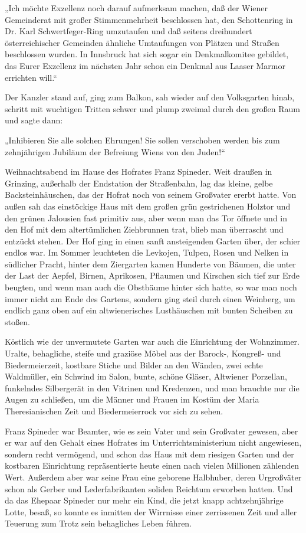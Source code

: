 „Ich möchte Exzellenz noch darauf aufmerksam machen, daß der Wiener
Gemeinderat mit großer Stimmenmehrheit beschlossen hat, den
Schottenring in Dr. Karl Schwertfeger-Ring umzutaufen und daß
seitens dreihundert österreichischer Gemeinden ähnliche Umtaufungen
von Plätzen und Straßen beschlossen wurden. In Innsbruck hat sich
sogar ein Denkmalkomitee gebildet, das Eurer Exzellenz im nächsten
Jahr schon ein Denkmal aus Laaser Marmor errichten will.“

Der Kanzler stand auf, ging zum Balkon, sah wieder auf den
Volksgarten hinab, schritt mit wuchtigen Tritten schwer und plump
zweimal durch den großen Raum und sagte dann:

„Inhibieren Sie alle solchen Ehrungen! Sie sollen verschoben werden
bis zum zehnjährigen Jubiläum der Befreiung Wiens von den Juden!“

\tb{* * *}
Weihnachtsabend im Hause des Hofrates Franz Spineder. Weit draußen
in Grinzing, außerhalb der Endstation der Straßenbahn, lag das
kleine, gelbe Backsteinhäuschen, das der Hofrat noch von seinem
Großvater ererbt hatte. Von außen sah das einstöckige Haus mit dem
großen grün gestrichenen Holztor und den grünen Jalousien fast
primitiv aus, aber wenn man das Tor öffnete und in den Hof mit dem
altertümlichen Ziehbrunnen trat,  blieb man
überrascht und entzückt stehen. Der Hof ging in einen sanft
ansteigenden Garten über, der schier endlos war. Im Sommer
leuchteten die Levkojen, Tulpen, Rosen und Nelken in südlicher
Pracht, hinter dem Ziergarten kamen Hunderte von Bäumen, die unter
der Last der Aepfel, Birnen, Aprikosen, Pflaumen und Kirschen sich
tief zur Erde beugten, und wenn man auch die Obstbäume hinter sich
hatte, so war man noch immer nicht am Ende des Gartens, sondern
ging steil durch einen Weinberg, um endlich ganz oben auf ein
altwienerisches Lusthäuschen mit bunten Scheiben zu stoßen.

Köstlich wie der unvermutete Garten war auch die Einrichtung der
Wohnzimmer. Uralte, behagliche, steife und graziöse Möbel aus der
Barock-, Kongreß- und Biedermeierzeit, kostbare Stiche und Bilder
an den Wänden, zwei echte Waldmüller, ein Schwind im Salon, bunte,
schöne Gläser, Altwiener Porzellan, funkelndes Silbergerät in den
Vitrinen und Kredenzen, und man brauchte nur die Augen zu
schließen, um die Männer und Frauen im Kostüm der Maria
Theresianischen Zeit und Biedermeierrock vor sich zu sehen.

Franz Spineder war Beamter, wie es sein Vater und sein Großvater
gewesen, aber er war auf den Gehalt eines Hofrates im
Unterrichtsministerium nicht angewiesen, sondern recht vermögend,
und schon das Haus mit dem riesigen Garten und der kostbaren
Einrichtung repräsentierte heute einen nach vielen Millionen
zählenden Wert. Außerdem aber war seine Frau eine geborene
Halbhuber, deren Urgroßväter schon als Gerber und Lederfabrikanten
soliden  Reichtum erworben hatten. Und da das
Ehepaar Spineder nur mehr ein Kind, die jetzt knapp achtzehnjährige
Lotte, besaß, so konnte es inmitten der Wirrnisse einer zerrissenen
Zeit und aller Teuerung zum Trotz sein behagliches Leben führen.

